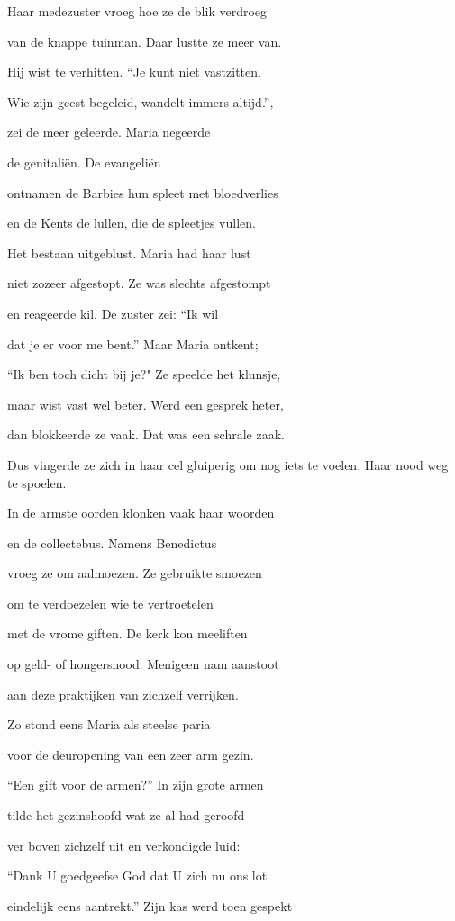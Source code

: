 Haar medezuster vroeg
hoe ze de blik verdroeg

van de knappe tuinman.
Daar lustte ze meer van.

Hij wist te verhitten.
“Je kunt niet vastzitten.

Wie zijn geest begeleid,
wandelt immers altijd.”,

zei de meer geleerde.
Maria negeerde

de genitaliën.
De evangeliën

ontnamen de Barbies
hun spleet met bloedverlies

en de Kents de lullen,
die de spleetjes vullen.

Het bestaan uitgeblust.
Maria had haar lust

niet zozeer afgestopt.
Ze was slechts afgestompt

en reageerde kil.
De zuster zei: “Ik wil

dat je er voor me bent.”
Maar Maria ontkent;

“Ik ben toch dicht bij je?"
Ze speelde het klunsje,

maar wist vast wel beter.
Werd een gesprek heter,

dan blokkeerde ze vaak.
Dat was een schrale zaak.

Dus vingerde ze zich
in haar cel gluiperig
om nog iets te voelen.
Haar nood weg te spoelen.

In de armste oorden
klonken vaak haar woorden

en de collectebus.
Namens Benedictus

vroeg ze om aalmoezen.
Ze gebruikte smoezen

om te verdoezelen
wie te vertroetelen

met de vrome giften.
De kerk kon meeliften

op geld- of hongersnood.
Menigeen nam aanstoot

aan deze praktijken
van zichzelf verrijken.

Zo stond eens Maria
als steelse paria

voor de deuropening
van een zeer arm gezin.

“Een gift voor de armen?”
In zijn grote armen

tilde het gezinshoofd
wat ze al had geroofd

ver boven zichzelf uit
en verkondigde luid:

“Dank U goedgeefse God
dat U zich nu ons lot

eindelijk eens aantrekt.”
Zijn kas werd toen gespekt

